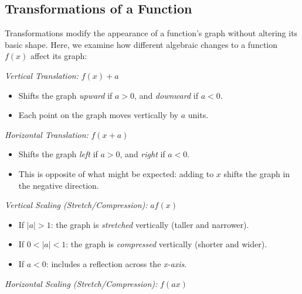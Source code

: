 \subsection{Transformations of a Function}

Transformations modify the appearance of a function's graph without altering its basic shape.
Here, we examine how different algebraic changes to a function \( f(x) \) affect its graph:
\vspace{\baselineskip}

\emph{Vertical Translation:} \( f(x) + a \)
	    
\begin{itemize}
	
	\item Shifts the graph \emph{upward} if \( a > 0 \), and \emph{downward} if \( a < 0 \).
	
	\item Each point on the graph moves vertically by \( a \) units.

\end{itemize}

\emph{Horizontal Translation:} \( f(x + a) \)

\begin{itemize}

	\item Shifts the graph \emph{left} if \( a > 0 \), and \emph{right} if \( a < 0 \).

	\item This is opposite of what might be expected: adding to \( x \) shifts the graph in the negative 
	      direction.

\end{itemize}

\emph{Vertical Scaling (Stretch/Compression):} \( a f(x) \)

\begin{itemize}
	
	\item If \( |a| > 1 \): the graph is \emph{stretched} vertically (taller and narrower).
	
	\item If \( 0 < |a| < 1 \): the graph is \emph{compressed} vertically (shorter and wider).
	
	\item If \( a < 0 \): includes a reflection across the \emph{x-axis}.

\end{itemize}

\emph{Horizontal Scaling (Stretch/Compression):} \( f(a x) \)


